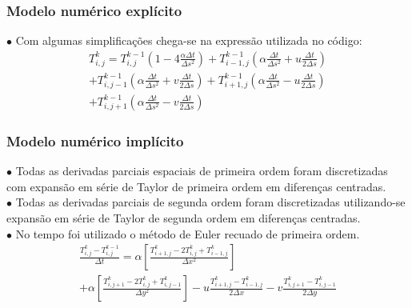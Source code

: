 \documentclass[xcolor=dvipsnames,10pt,aspectratio=169]{beamer}
\begin{document}
	\begin{frame}
		\frametitle{Modelo numérico explícito}
		$\bullet$ Com algumas simplificações chega-se na expressão utilizada no código:
		\begin{equation}
			\begin{split}
			T_{i,j}^{k} = T_{i,j}^{k-1} \left( 1 - 4 \frac{\alpha \Delta t}{\Delta s ^2}\right) + T_{i -1, j}^{k-1} \left( \alpha \frac{\Delta t}{\Delta s^2} + u \frac{\Delta t}{2 \Delta s} \right)\\
			+ T_{i,j-1}^{k-1} \left( \alpha \frac{\Delta t}{\Delta s^2} + v \frac{\Delta t}{2 \Delta s} \right) +  T_{i+1,j}^{k-1} \left( \alpha \frac{\Delta t}{ \Delta s^2} - u \frac{\Delta t}{2 \Delta s}\right) \\
			+  T_{i,j+1}^{k-1} \left( \alpha \frac{\Delta t}{\Delta s^2} - v \frac{\Delta t}{2 \Delta s}\right)
			\end{split}
		\end{equation}
	\end{frame}





	\begin{frame}
		\frametitle{Modelo numérico implícito}
		$\bullet$ Todas as derivadas parciais espaciais de primeira ordem foram discretizadas com expansão em série de Taylor de primeira ordem em diferenças centradas.\\
		$\bullet$ Todas as derivadas parciais de segunda ordem foram discretizadas utilizando-se expansão em série de Taylor de segunda ordem em diferenças centradas.\\
		$\bullet$ No tempo foi utilizado o método de Euler recuado de primeira ordem.\\
		\begin{equation}
			\begin{split}
			\frac{T_{i,j}^{k} - T_{i , j}^{k-1} }{\Delta t}
			= \alpha \left[  \frac{T_{i+1,j}^{k} - 2 T_{i,j}^{k} + T_{i-1,j}^{k} }{\Delta x^2} \right]\\
			+\alpha \left[\frac{T_{i,j+1}^{k} - 2 T_{i,j}^{k} + T_{i,j-1}^{k}}{\Delta y^2}\right] - u \frac{T_{i+1,j}^{k} - T_{i-1,j}^{k}}{2 \Delta x} - v \frac{T_{i,j+1}^{k} - T_{i , j-1}^{k}}{2 \Delta y}
			\end{split}
		\end{equation}
	\end{frame}
\end{document}
